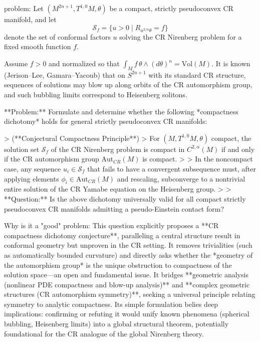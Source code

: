 problem:  
Let \((M^{2n+1}, T^{1,0}M, \theta)\) be a compact, strictly pseudoconvex CR manifold, and let  
\[
\mathcal{S}_f = \{u>0 \mid R_{u^{2/n}\theta} = f \}
\]
denote the set of conformal factors \(u\) solving the CR Nirenberg problem for a fixed smooth function \(f\).  

Assume \(f>0\) and normalized so that \(\int_M f\,\theta \wedge (d\theta)^n = \text{Vol}(M)\).  
It is known (Jerison–Lee, Gamara–Yacoub) that on \(S^{2n+1}\) with its standard CR structure, sequences of solutions may blow up along orbits of the CR automorphism group, and such bubbling limits correspond to Heisenberg solitons.  

**Problem:**  
Formulate and determine whether the following *compactness dichotomy* holds for general strictly pseudoconvex CR manifolds:

> (**Conjectural Compactness Principle**)  
> For \((M, T^{1,0}M, \theta)\) compact, the solution set \(\mathcal{S}_f\) of the CR Nirenberg problem is compact in \(C^{2,\alpha}(M)\) if and only if the CR automorphism group \(\mathrm{Aut}_{CR}(M)\) is compact.  
> 
> In the noncompact case, any sequence \(u_i \in \mathcal{S}_f\) that fails to have a convergent subsequence must, after applying elements \(\phi_i \in \mathrm{Aut}_{CR}(M)\) and rescaling, subconverge to a nontrivial entire solution of the CR Yamabe equation on the Heisenberg group.  
> 
> **Question:** Is the above dichotomy universally valid for all compact strictly pseudoconvex CR manifolds admitting a pseudo-Einstein contact form?

Why is it a "good" problem:  
This question explicitly proposes a **CR compactness dichotomy conjecture**, paralleling a central structure result in conformal geometry but unproven in the CR setting. It removes trivialities (such as automatically bounded curvature) and directly asks whether the *geometry of the automorphism group* is the unique obstruction to compactness of the solution space—an open and fundamental issue. It bridges **geometric analysis (nonlinear PDE compactness and blow-up analysis)** and **complex geometric structures (CR automorphism symmetry)**, seeking a universal principle relating symmetry to analytic compactness. Its simple formulation belies deep implications: confirming or refuting it would unify known phenomena (spherical bubbling, Heisenberg limits) into a global structural theorem, potentially foundational for the CR analogue of the global Nirenberg theory.